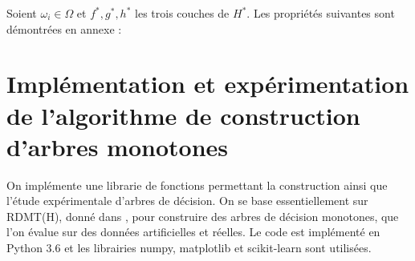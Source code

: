 \documentclass[a4paper]{article}
\begin{document}
Soient $\omega_i \in \Omega$ et $f^*, g^*, h^*$ les trois couches de $H^*$. Les propriétés suivantes sont
démontrées en annexe :


\section{Implémentation et expérimentation de l'algorithme de construction
d'arbres monotones} 
On implémente une librarie de fonctions permettant la
construction ainsi que l'étude expérimentale d'arbres de décision.  On se base
essentiellement sur RDMT(H), donné dans \cite{marsala-rank}, pour construire des
arbres de décision monotones, que l'on évalue sur des données artificielles et
réelles. Le code est implémenté en Python 3.6 et les librairies numpy,
matplotlib et scikit-learn sont utilisées.
\end{document}
